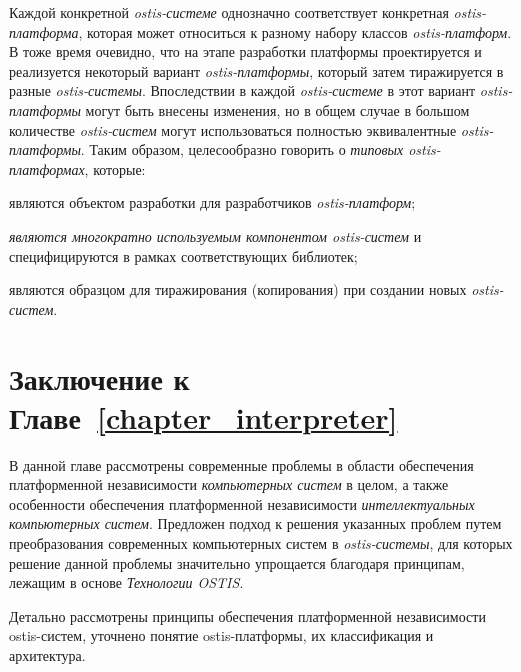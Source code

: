 Каждой конкретной \textit{ostis-системе} однозначно соответствует конкретная \textit{ostis-платформа}, которая может относиться к разному набору классов \textit{ostis-платформ}. В тоже время очевидно, что на этапе разработки платформы проектируется и реализуется некоторый вариант \textit{ostis-платформы}, который затем тиражируется в разные \textit{ostis-системы}. Впоследствии в каждой \textit{ostis-системе} в этот вариант \textit{ostis-платформы} могут быть внесены изменения, но в общем случае в большом количестве \textit{ostis-систем} могут использоваться полностью эквивалентные \textit{ostis-платформы}. Таким образом, целесообразно говорить о \textit{типовых ostis-платформах}, которые:
\begin{textitemize}
	\item являются объектом разработки для разработчиков \textit{ostis-платформ};
	\item \textit{являются многократно используемым компонентом ostis-систем} и специфицируются в рамках соответствующих библиотек;
	\item являются образцом для тиражирования (копирования) при создании новых \textit{ostis-систем}.
\end{textitemize}
		
\section*{Заключение к Главе~\ref{chapter_interpreter}}
		
В данной главе рассмотрены современные проблемы в области обеспечения платформенной независимости \textit{компьютерных систем} в целом, а также особенности обеспечения платформенной независимости \textit{интеллектуальных компьютерных систем}. Предложен подход к решения указанных проблем путем преобразования современных компьютерных систем в \textit{ostis-системы}, для которых решение данной проблемы значительно упрощается благодаря принципам, лежащим в основе \textit{Технологии OSTIS}.

Детально рассмотрены принципы обеспечения платформенной независимости ostis-систем, уточнено понятие ostis-платформы, их классификация и архитектура.
		
%